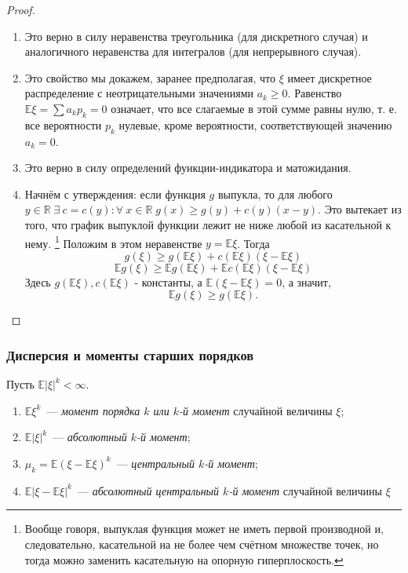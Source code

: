 \begin{proof}
\begin{enumerate}
    \item Это верно в силу неравенства треугольника (для дискретного случая) и аналогичного неравенства для интегралов (для непрерывного случая).
    
    \item Это свойство мы докажем, заранее предполагая, что $\xi$ имеет дискретное распределение с неотрицательными значениями $a_k \geqslant 0$. Равенство $\mathbb{E}\xi = \sum a_k p_k = 0$ означает, что все слагаемые в этой сумме равны нулю, т. е. все вероятности $p_k$ нулевые, кроме вероятности, соответствующей значению $a_k = 0$.
    
    \item Это верно в силу определений функции-индикатора и матожидания.
    
    \item Начнём с утверждения: если функция $g$ выпукла, то для любого ${y \in \mathbb{R}} \; {\exists \: c = c(y) \colon} \forall \: x \in \mathbb{R} \; g(x) \geqslant g(y) + c(y)(x - y)$. Это вытекает из того, что график выпуклой функции лежит не ниже любой из касательной к нему. \footnote{Вообще говоря, выпуклая функция может не иметь первой производной и, следовательно, касательной на не более чем счётном множестве точек, но тогда можно заменить касательную на опорную гиперплоскость.} Положим в этом неравенстве $y = \mathbb{E}\xi$. Тогда
    $$ g(\xi) \geqslant g(\mathbb{E}\xi) + c(\mathbb{E}\xi)(\xi - \mathbb{E}\xi) $$
    $$ \mathbb{E}g(\xi) \geqslant \mathbb{E}g(\mathbb{E}\xi) +  \mathbb{E}c(\mathbb{E}\xi)(\xi - \mathbb{E}\xi)$$
    Здесь $g(\mathbb{E}\xi), c(\mathbb{E}\xi)$ - константы, а $\mathbb{E}(\xi - \mathbb{E}\xi) = 0$, а значит,
    $$ \mathbb{E}g(\xi) \geqslant g(\mathbb{E}\xi).$$
\end{enumerate}
\end{proof}

\subsubsection{Дисперсия и моменты старших порядков}

\begin{defn}
    Пусть ${\mathbb{E}|\xi|^k < \infty}$. 
    \begin{enumerate}
        \item ${\mathbb{E}\xi^k}$~--- {\it момент порядка $k$ или $k$-й момент} случайной величины $\xi$;
        \item ${\mathbb{E}|\xi|^k}$~--- {\it абсолютный $k$-й момент};
        \item $\mu_k = {\mathbb{E}(\xi - \mathbb{E}\xi)^k}$~--- {\it центральный $k$-й момент};
        \item ${\mathbb{E}|\xi - \mathbb{E}\xi|^k}$~--- {\it абсолютный центральный $k$-й момент} случайной величины $\xi$
    \end{enumerate}
\end{defn}


